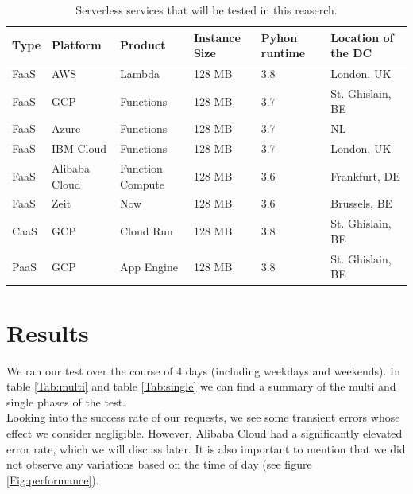 \documentclass[11pt]{article}
\begin{document}
\begin{table}
\begin{adjustwidth}{-0.9cm}{}
 \begin{tabularx}{1.1\textwidth}{p{1cm} X X X X p{3cm}}
 \textbf{Type} & \textbf{Platform} & \textbf{Product} & \textbf{Instance Size} & \textbf{Pyhon runtime} & \textbf{Location of the DC} \\
 \hline
 \hline
 FaaS & AWS & Lambda & 128 MB & 3.8 & London, UK \\
 \hline
 FaaS & GCP & Functions & 128 MB & 3.7 & St. Ghislain, BE \\
 \hline
 FaaS & Azure & Functions & 128 MB & 3.7 & NL \\
 \hline
 FaaS & IBM Cloud & Functions & 128 MB & 3.7 & London, UK\\
 \hline
 FaaS & Alibaba Cloud & Function Compute  & 128 MB & 3.6 & Frankfurt, DE\\
 \hline
 FaaS & Zeit & Now  & 128 MB & 3.6 & Brussels, BE\\
 \hline
 CaaS & GCP & Cloud Run & 128 MB & 3.8 & St. Ghislain, BE\\
 \hline
 PaaS & GCP & App Engine & 128 MB & 3.8 & St. Ghislain, BE\\
 \hline

\end{tabularx}
\caption{Serverless services that will be tested in this reaserch.}
\label{Tab:services}
\end{adjustwidth}
\end{table}




\section{Results}

We ran our test over the course of 4 days (including weekdays and weekends). In table \ref{Tab:multi} and table \ref{Tab:single} we can find a summary of the multi and single phases of the test. \\

Looking into the success rate of our requests, we see some transient errors whose effect we consider negligible. However, Alibaba Cloud had a significantly elevated error rate, which we will discuss later. It is also important to mention that we did not observe any variations based on the time of day (see figure \ref{Fig:performance}).
\end{document}
